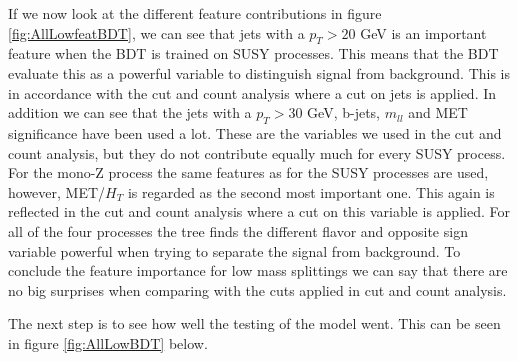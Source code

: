 If we now look at the different feature contributions in figure \ref{fig:AllLowfeatBDT}, we can see that jets with a $p_T > 20$ GeV is an important feature when the BDT is trained on SUSY processes. This means that the BDT evaluate this as a powerful variable to distinguish signal from background. This is in accordance with the cut and count analysis where a cut on jets is applied. In addition we can see that the jets with a $p_T > 30$ GeV, b-jets, $m_{ll}$ and MET significance have been used a lot. These are the variables we used in the cut and count analysis, but they do not contribute equally much for every SUSY process. For the mono-Z process the same features as for the SUSY processes are used, however, MET/$H_T$ is regarded as the second most important one. This again is reflected in the cut and count analysis where a cut on this variable is applied. For all of the four processes the tree finds the different flavor and opposite sign variable powerful when trying to separate the signal from background. To conclude the feature importance for low mass splittings we can say that there are no big surprises when comparing with the cuts applied in cut and count analysis.

The next step is to see how well the testing of the model went. This can be seen in figure \ref{fig:AllLowBDT} below.

